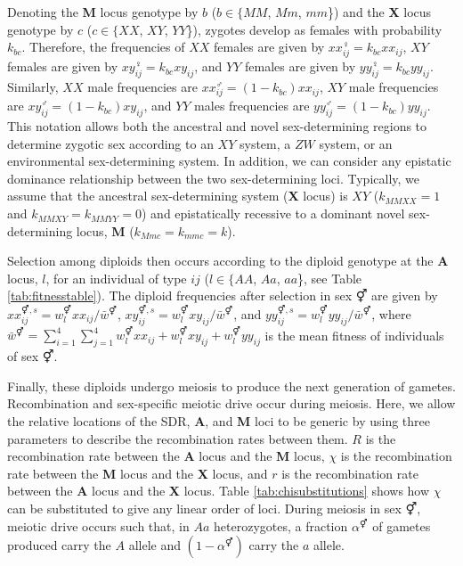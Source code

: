 \documentclass[12pt]{article}
\begin{document}
Denoting the \textbf{M} locus genotype by $b$ ($b\in \{MM$, $Mm$, $mm$\}) and the \textbf{X} locus genotype by $c$ ($c\in \{XX$, $XY$, $YY$\}), zygotes develop as females with probability $k_{bc}$. 
Therefore, the frequencies of $XX$ females are given by $xx_{ij}^{\female}=k_{bc}xx_{ij}$, $XY$ females are given by $xy_{ij}^{\female}=k_{bc}xy_{ij}$, and $YY$ females are given by $yy_{ij}^{\female}=k_{bc}yy_{ij}$. 
Similarly, $XX$ male frequencies are $xx_{ij}^{\male}=(1-k_{bc})xx_{ij}$, $XY$ male frequencies are $xy_{ij}^{\male}=(1-k_{bc})xy_{ij}$, and $YY$ males frequencies are $yy_{ij}^{\male}=(1-k_{bc})yy_{ij}$.
This notation allows both the ancestral and novel sex-determining regions to determine zygotic sex according to an $XY$ system, a $ZW$ system, or an environmental sex-determining system. 
In addition, we can consider any epistatic dominance relationship between the two sex-determining loci. 
Typically, we assume that the ancestral sex-determining system (\textbf{X} locus) is $XY$ ($k_{MMXX}=1$ and $k_{MMXY}=k_{MMYY}=0$) and epistatically recessive to a dominant novel sex-determining locus, \textbf{M} ($k_{Mmc}=k_{mmc}=k$). 


Selection among diploids then occurs according to the diploid genotype at the \textbf{A} locus, $l$, for an individual of type $ij$ ($l \in \{AA$, $Aa$, $aa$\}, see Table \ref{tab:fitnesstable}). 
The diploid frequencies after selection in sex $\Hermaphrodite$ are given by $xx_{ij}^{\Hermaphrodite,s}=w_{l}^{\Hermaphrodite} xx_{ij}/\bar{w}^{\Hermaphrodite}$, $xy_{ij}^{\Hermaphrodite,s}=w_{l}^{\Hermaphrodite} xy_{ij}/\bar{w}^{\Hermaphrodite}$, and $yy_{ij}^{\Hermaphrodite,s}=w_{l}^{\Hermaphrodite} yy_{ij}/\bar{w}^{\Hermaphrodite}$, where $\bar{w}^{\Hermaphrodite}= \sum_{i=1}^{4}\sum_{j=1}^{4}w_{l}^{\Hermaphrodite}xx_{ij}+w_{l}^{\Hermaphrodite}xy_{ij}+w_{l}^{\Hermaphrodite}yy_{ij}$ is the mean fitness of individuals of sex $\Hermaphrodite$. 

Finally, these diploids undergo meiosis to produce the next generation of gametes. 
Recombination and sex-specific meiotic drive occur during meiosis.
Here, we allow the relative locations of the SDR, \textbf{A}, and \textbf{M} loci to be generic by using three parameters to describe the recombination rates between them. $R$ is the recombination rate between the \textbf{A} locus and the \textbf{M} locus, $\chi$ is the recombination rate between the \textbf{M} locus and the \textbf{X} locus, and $r$ is the recombination rate between the \textbf{A} locus and the \textbf{X} locus. 
Table \ref{tab:chisubstitutions} shows how $\chi$ can be substituted to give any linear order of loci.
During meiosis in sex $\Hermaphrodite$, meiotic drive occurs such that, in $Aa$ heterozygotes, a fraction $\alpha^{\Hermaphrodite}$ of gametes produced carry the $A$ allele and $(1-\alpha^\Hermaphrodite)$ carry the $a$ allele. 
\end{document}
